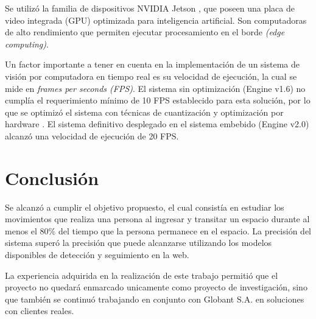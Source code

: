 \documentclass[a4paper]{IEEEtran}
\begin{document}
Se utilizó la familia de dispositivos NVIDIA Jetson \cite{b19}, que poseen una placa de video integrada (GPU) optimizada para inteligencia artificial. Son computadoras de alto rendimiento que permiten ejecutar procesamiento en el borde \textit{(edge computing)}.

Un factor importante a tener en cuenta en la implementación de un sistema de visión por computadora en tiempo real es su velocidad de ejecución, la cual se mide en \textit{frames per seconds (FPS)}\cite{b20}. El sistema sin optimización (Engine v1.6) no cumplía el requerimiento mínimo de 10 FPS establecido para esta solución, por lo que se optimizó el sistema  con técnicas de cuantización y optimización por hardware \cite{b21}. El sistema definitivo desplegado en el sistema embebido (Engine v2.0) alcanzó una velocidad de ejecución de 20 FPS.

\section{Conclusión}

Se alcanzó a cumplir el objetivo propuesto, el cual consistía en estudiar los movimientos que realiza una persona al ingresar y transitar un espacio durante al menos el 80\% del tiempo que la persona permanece en el espacio. La precisión del sistema superó la precisión que puede alcanzarse utilizando los modelos disponibles de detección y seguimiento en la web.

La experiencia adquirida en la realización de este trabajo permitió que el proyecto no quedará enmarcado unicamente como proyecto de investigación, sino que también se continuó trabajando en conjunto con Globant S.A.\cite{b22} en soluciones con clientes reales.
\end{document}
